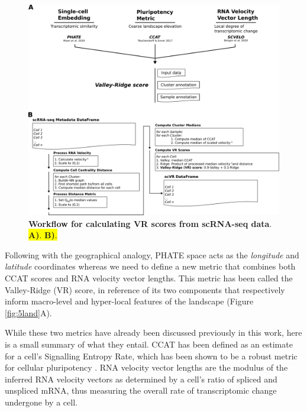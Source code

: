 \begin{figure}
    \centering
    \includegraphics{05vr/figs/5VR_score.png}
    \caption{\textbf{Workflow for calculating VR scores from scRNA-seq data}. \colorbox{yellow}{\textbf{A)}. \textbf{B)}.}}
    \label{fig:5score}
\end{figure}

Following with the geographical analogy, PHATE space acts as the \emph{longitude} and \emph{latitude} coordinates whereas we need to define a new metric that combines both CCAT scores and RNA velocity vector lengths. This metric has been called the Valley-Ridge (VR) score, in reference of its two components that respectively inform macro-level and hyper-local features of the landscape (Figure \ref{fig:5land}A).

While these two metrics have already been discussed previously in this work, here is a small summary of what they entail. CCAT has been defined as an estimate for a cell's Signalling Entropy Rate, which has been shown to be a robust metric for cellular pluripotency \cite{teschendorff_single-cell_2017,chen_single-cell_2019,senra_origins_2022}. RNA velocity vector lengths are the modulus of the inferred RNA velocity vectors as determined by a cell's ratio of spliced and unspliced mRNA, thus measuring the overall rate of transcriptomic change undergone by a cell.

